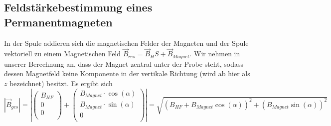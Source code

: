 \documentclass[a4paper,10pt]{scrartcl} %
\begin{document}
\subsection{Feldstärkebestimmung eines Permanentmagneten}
\label{subsec:Auswertung-Feldstaerkebestimmung}
In der Spule addieren sich die magnetischen Felder der Magneten und der Spule vektoriell zu einem Magnetischen Feld $\vec{B}_{res} = \vec{B}_HS + \vec{B}_{Magnet}$. Wir nehmen in unserer Berechnung an, dass der Magnet zentral unter der Probe steht, sodass dessen Magnetfeld keine Komponente in der vertikale Richtung (wird ab hier als $z$ bezeichnet) besitzt. Es ergibt sich
\begin{equation}
|\vec{B}_{ges}| = | \left( \begin{array}{c}
B_{HF}\\
0\\
0\\
\end{array} \right) + \left( \begin{array}{c}
B_{Magnet} \cdot \cos (\alpha)\\
B_{Magnet} \cdot \sin (\alpha)\\
0\\
\end{array} \right)
| = \sqrt{(B_{HF}+ B_{Magnet}\cos(\alpha))^2 + (B_{Magnet}\sin(\alpha))^2}
\end{equation}
\newpage
\end{document}

